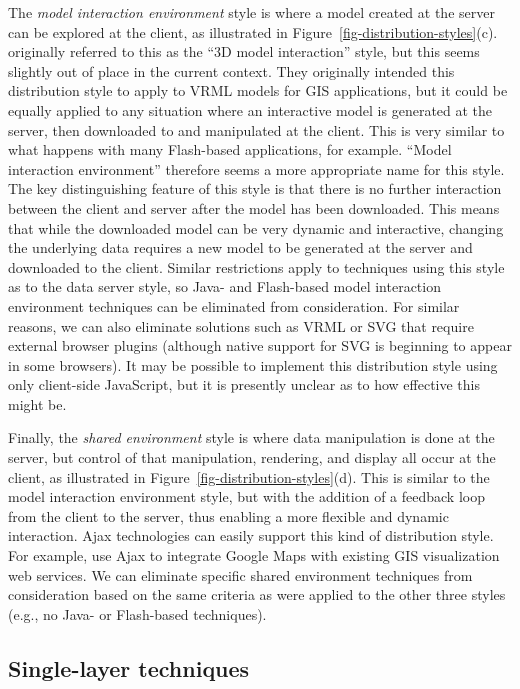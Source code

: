 \documentclass[acmnow]{acmtrans2m}
\begin{document}
The \emph{model interaction environment} style is where a model created
at the server can be explored at the client, as illustrated in
Figure~\ref{fig-distribution-styles}(c). 
originally referred to this as the ``3D model interaction'' style, but
this seems slightly out of place in the current context. They originally
intended this distribution style to apply to VRML models for GIS
applications, but it could be equally applied to any situation where an
interactive model is generated at the server, then downloaded to and
manipulated at the client. This is very similar to what happens with
many Flash-based applications, for example. ``Model interaction
environment'' therefore seems a more appropriate name for this style.
The key distinguishing feature of this style is that there is no further
interaction between the client and server after the model has been
downloaded. This means that while the downloaded model can be very
dynamic and interactive, changing the underlying data requires a new
model to be generated at the server and downloaded to the client.
Similar restrictions apply to techniques using this style as to the data
server style, so Java- and Flash-based model interaction environment
techniques can be eliminated from consideration. For similar reasons, we
can also eliminate solutions such as VRML or SVG that require external
browser plugins (although native support for SVG is beginning to appear
in some browsers). It may be possible to implement this distribution
style using only client-side JavaScript, but it is presently unclear as
to how effective this might be.

Finally, the \emph{shared environment} style is where data manipulation
is done at the server, but control of that manipulation, rendering, and
display all occur at the client, as illustrated in
Figure~\ref{fig-distribution-styles}(d). This is similar to the model
interaction environment style, but with the addition of a feedback loop
from the client to the server, thus enabling a more flexible and dynamic
interaction. Ajax technologies \cite{Garr-JJ-2005-Ajax} can easily
support this kind of distribution style. For example,
 use Ajax to integrate Google Maps with
existing GIS visualization web services. We can eliminate specific
shared environment techniques from consideration based on the same
criteria as were applied to the other three styles (e.g., no Java- or
Flash-based techniques).


\subsection{Single-layer techniques}
\label{sec-image-gen}
\end{document}
